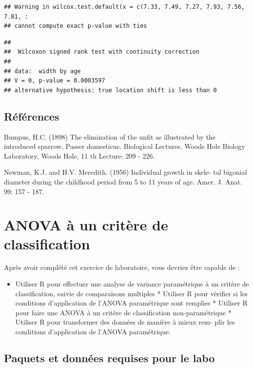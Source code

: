\documentclass[12pt,]{book}
\providecommand{\tightlist}{%
  \setlength{\itemsep}{0pt}\setlength{\parskip}{0pt}}
\begin{document}
\begin{verbatim}
## Warning in wilcox.test.default(x = c(7.33, 7.49, 7.27, 7.93, 7.56, 7.81, :
## cannot compute exact p-value with ties
\end{verbatim}

\begin{verbatim}
## 
## 	Wilcoxon signed rank test with continuity correction
## 
## data:  width by age
## V = 0, p-value = 0.0003597
## alternative hypothesis: true location shift is less than 0
\end{verbatim}

\hypertarget{ruxe9fuxe9rences}{%
\section{Références}\label{ruxe9fuxe9rences}}

Bumpus, H.C. (1898) The elimination of the unfit as illustrated by the introduced sparrow, Passer domesticus. Biological Lectures, Woods Hole Biology Laboratory, Woods Hole, 11 th Lecture: 209 - 226.

Newman, K.J. and H.V. Meredith. (1956) Individual growth in skele- tal bigonial diameter during the childhood period from 5 to 11 years of age. Amer. J. Anat. 99: 157 - 187.

\hypertarget{anova-uxe0-un-crituxe8re-de-classification}{%
\chapter{ANOVA à un critère de classification}\label{anova-uxe0-un-crituxe8re-de-classification}}

Après avoir complété cet exercice de laboratoire, vous devriez être capable de :

\begin{itemize}
\tightlist
\item
  Utiliser R pour effectuer une analyse de variance paramétrique à un critère de classification, suivie de comparaisons multiples * Utiliser R pour vérifier si les conditions d'application de l'ANOVA paramétrique sont remplies * Utiliser R pour faire une ANOVA à un critère de classification non-paramétrique * Utiliser R pour transformer des données de manière à mieux rem- plir les conditions d'application de l'ANOVA paramétrique.
\end{itemize}

\hypertarget{set-ano}{%
\section{Paquets et données requises pour le labo}\label{set-ano}}
\end{document}
